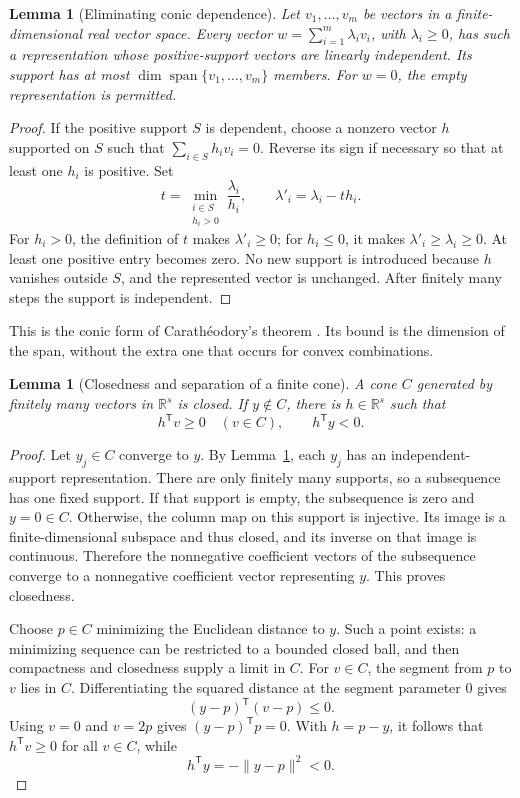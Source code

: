 \documentclass[11pt,letterpaper]{article}
\newcommand{\R}{\mathbb R}
\newcommand{\T}{\mathsf T}
\DeclareMathOperator{\spanop}{span}
\newtheorem{lemma}[theorem]{Lemma}
\theoremstyle{definition}
\theoremstyle{remark}
\numberwithin{equation}{section}
\begin{document}
\begin{lemma}[Eliminating conic dependence]\label{lem:conic}
Let \(v_1,\ldots,v_m\) be vectors in a finite-dimensional real vector space.
Every vector \(w=\sum_{i=1}^m\lambda_i v_i\), with \(\lambda_i\ge0\), has
such a representation whose positive-support vectors are linearly independent.
Its support has at most \(\dim\spanop\{v_1,\ldots,v_m\}\) members.
For \(w=0\), the empty representation is permitted.
\end{lemma}
\begin{proof}
If the positive support \(S\) is dependent, choose a nonzero vector \(h\)
supported on \(S\) such that \(\sum_{i\in S}h_i v_i=0\). Reverse its sign
if necessary so that at least one \(h_i\) is positive. Set
\begin{equation}\label{eq:conic-step}
 t=\min_{\substack{i\in S\\h_i>0}}\frac{\lambda_i}{h_i},
 \qquad \lambda'_i=\lambda_i-t h_i.
\end{equation}
For \(h_i>0\), the definition of \(t\) makes \(\lambda'_i\ge0\);
for \(h_i\le0\), it makes \(\lambda'_i\ge\lambda_i\ge0\).
At least one positive entry becomes zero. No new support is introduced
because \(h\) vanishes outside \(S\), and the represented vector is unchanged.
After finitely many steps the support is independent.
\end{proof}

This is the conic form of Carath\'eodory's theorem
\cite[pp.~8--9]{bertsekas3}. Its bound is the dimension of the span,
without the extra one that occurs for convex combinations.

\begin{lemma}[Closedness and separation of a finite cone]\label{lem:separate}
A cone \(C\) generated by finitely many vectors in \(\R^s\) is closed.
If \(y\notin C\), there is \(h\in\R^s\) such that
\[
 h^\T v\ge0\quad(v\in C),\qquad h^\T y<0.
\]
\end{lemma}
\begin{proof}
Let \(y_j\in C\) converge to \(y\). By Lemma~\ref{lem:conic}, each \(y_j\)
has an independent-support representation. There are only finitely many
supports, so a subsequence has one fixed support. If that support is empty,
the subsequence is zero and \(y=0\in C\). Otherwise, the column map on this
support is injective. Its image is a finite-dimensional subspace and thus
closed, and its inverse on that image is continuous. Therefore the
nonnegative coefficient vectors of the subsequence converge to a
nonnegative coefficient vector representing \(y\). This proves closedness.

Choose \(p\in C\) minimizing the Euclidean distance to \(y\). Such a point
exists: a minimizing sequence can be restricted to a bounded closed ball,
and then compactness and closedness supply a limit in \(C\).
For \(v\in C\), the segment from \(p\) to \(v\) lies in \(C\).
Differentiating the squared distance at the segment parameter \(0\) gives
\[
 (y-p)^\T(v-p)\le0 .
\]
Using \(v=0\) and \(v=2p\) gives \((y-p)^\T p=0\).
With \(h=p-y\), it follows that \(h^\T v\ge0\) for all \(v\in C\), while
\[
 h^\T y=-\|y-p\|^2<0.
\]
\end{proof}
\end{document}
